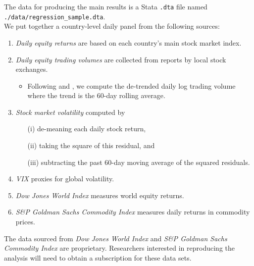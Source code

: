 \documentclass[11pt, fleqn]{article}
\begin{document}
The data for producing the main results is a Stata \texttt{.dta} file named \texttt{./data/regression\_sample.dta}. 
\\ We put together a country-level daily panel from the following sources: 

\begin{enumerate}
\item \textit{Daily equity returns} are based on each country's main stock market index. 
\item \textit{Daily equity trading volumes} are collected from reports by local stock exchanges. 
\begin{itemize}
\item Following \citet{campbell_grossman_wang_1993} and \citet{tetlock_2007}, we compute the de-trended daily log trading volume where the trend is the 60-day rolling average. 
\end{itemize}
\item \textit{Stock market volatility} computed by 
\begin{enumerate}
\item[(i)] de-meaning each daily stock return, 
\item[(ii)] taking the square of this residual, and 
\item[(iii)] subtracting the past 60-day moving average of the squared residuals.
\end{enumerate}
\item \textit{VIX} proxies for global volatility. %
\item \textit{Dow Jones World Index} measures world equity returns. 
\item \textit{S\&P Goldman Sachs Commodity Index} measures daily returns in commodity prices. 
\end{enumerate}

The data sourced from \textit{Dow Jones World Index} and \textit{S\&P Goldman Sachs Commodity Index} are proprietary. Researchers interested in reproducing the analysis will need to obtain a subscription for these data sets. 




\end{document}
